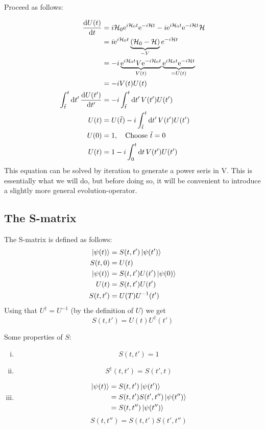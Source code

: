  Proceed as follows: 
 
 \begin{align*} 
 \dv{U(t)}{t} &=  i\mathcal{H}_0\mathrm{e}^{i\mathcal{H}_0 t}\mathrm{e}^{-i\mathcal{H} t}- i\mathrm{e}^{i\mathcal{H}_0 t}\mathrm{e}^{-i\mathcal{H} t}\mathcal{H} \\
 &= i \mathrm{e}^{i\mathcal{H}_0 t}\underbrace{\left( \mathcal{H}_0 - \mathcal{H} \right)}_{-V}e^{-i\mathcal{H} t} \\
 &= -i \underbrace{\mathrm{e}^{i\mathcal{H}_0 t}V\mathrm{e}^{-i\mathcal{H}_0 t}}_{V(t)}\underbrace{\mathrm{e}^{i\mathcal{H}_0 t}\mathrm{e}^{-i\mathcal{H} t}}_{=U(t)} \\
 &= -iV(t)U(t) \\
 \int_{\tilde{t}}^{t}\dd{t'} \dv{U(t')}{t'} &= -i\int_{\tilde{t}}^{t}\dd{t'}V(t')U(t') \\
 U(t) &= U(\tilde{t}) -i \int_{\tilde{t}}^{t}\dd{t'}V(t')U(t') \\
 U(0) &= 1, \quad \text{Choose } \tilde{t} =0 \\
 U(t) &= 1 -i\int_0^t\dd{t}V(t')U(t')
 \end{align*}
 This equation can be solved by iteration to generate a power seris in V. This is essentially what we will do, but before doing so, it will be convenient to introduce a slightly more general evolution-operator.
 
\subsection{The S-matrix}

The S-matrix is defined as follows:
\begingroup
\addtolength{\jot}{1em}
\begin{align*}
\ket{\psi(t)} &= S(t, t')\ket{\psi(t')} \\
S(t,0) &= U(t)\\
\ket{\psi(t)} &= S(t, t')U(t')\ket{\psi(0)} \\
U(t) &= S(t, t')U(t') \\
S(t, t') &= U(T)U^{-1}(t')
\end{align*}
\endgroup
Using that $U^\dagger = U^{-1}$ (by the definition of $U$) we get
\begin{equation} 
S(t, t') = U(t)U^\dagger (t')
\end{equation}

Some properties of $S$:
\begin{enumerate}[i)]
	\item \[S(t, t') = 1\]
	\item \begin{equation}\label{eq:S_prop} 
	S^\dagger(t, t') = S(t', t)
	\end{equation}
	\item \begin{align*} 
	\ket{\psi(t)} &= S(t, t')\ket{\psi(t')} \\
	&=  S(t, t')S(t', t'')\ket{\psi(t'')} \\
	&=  S(t, t'')\ket{\psi(t'')}
	\end{align*}
	\begin{equation} 
	\label{eq:S_matrix}
	S(t, t'') = S(t, t')S(t', t'')
	\end{equation}
\end{enumerate}

